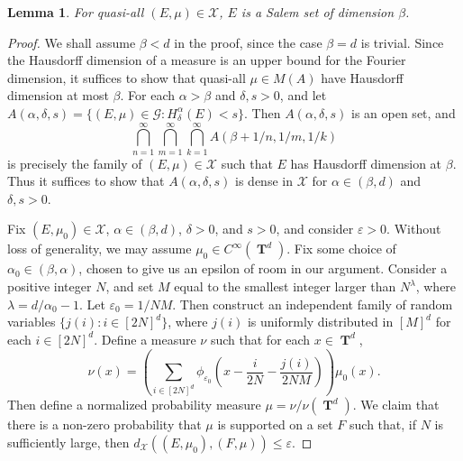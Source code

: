 \documentclass[12pt,reqno]{article}
\numberwithin{equation}{section}
\DeclareMathOperator{\hausdim}{\dim_{\mathbf{H}}}
\DeclareMathOperator{\fordim}{\dim_{\mathbf{F}}}
\DeclareMathOperator{\TT}{\mathbf{T}}
\newtheorem{lemma}[theorem]{Lemma}
\begin{document}
\begin{lemma}
    For quasi-all $(E,\mu) \in \mathcal{X}$, $E$ is a Salem set of dimension $\beta$.
\end{lemma}
\begin{proof}
    We shall assume $\beta < d$ in the proof, since the case $\beta = d$ is trivial. Since the Hausdorff dimension of a measure is an upper bound for the Fourier dimension, it suffices to show that quasi-all $\mu \in M(A)$ have Hausdorff dimension at most $\beta$. For each $\alpha > \beta$ and $\delta, s > 0$, and let $A(\alpha,\delta,s) = \{ (E,\mu) \in \mathcal{G}: H^\alpha_\delta(E) < s \}$. Then $A(\alpha,\delta,s)$ is an open set, and
    \[ \bigcap_{n = 1}^\infty \bigcap_{m = 1}^\infty \bigcap_{k = 1}^\infty A(\beta + 1/n, 1/m, 1/k) \]
    is precisely the family of $(E,\mu) \in \mathcal{X}$ such that $E$ has Hausdorff dimension at $\beta$.
%
    Thus it suffices to show that $A(\alpha,\delta,s)$ is dense in $\mathcal{X}$ for $\alpha \in (\beta,d)$ and $\delta, s > 0$.

    Fix $(E,\mu_0) \in \mathcal{X}$, $\alpha \in (\beta,d)$, $\delta > 0$, and $s > 0$, and consider $\varepsilon > 0$. Without loss of generality, we may assume $\mu_0 \in C^\infty(\TT^d)$. Fix some choice of $\alpha_0 \in (\beta,\alpha)$, chosen to give us an epsilon of room in our argument. Consider a positive integer $N$, and set $M$ equal to the smallest integer larger than $N^\lambda$, where $\lambda = d/\alpha_0 - 1$. Let $\varepsilon_0 = 1/NM$. Then construct an independent family of random variables $\{ j(i) : i \in [2N]^d \}$, where $j(i)$ is uniformly distributed in $[M]^d$ for each $i \in [2N]^d$. Define a measure $\nu$ such that for each $x \in \TT^d$,
    \[ \nu(x) = \left( \sum_{i \in [2N]^d} \phi_{\varepsilon_0} \left( x - \frac{i}{2N} - \frac{j(i)}{2NM} \right) \right) \mu_0(x). \]
    Then define a normalized probability measure $\mu = \nu / \nu(\TT^d)$. We claim that there is a non-zero probability that $\mu$ is supported on a set $F$ such that, if $N$ is sufficiently large, then $d_{\mathcal{X}}((E,\mu_0),(F,\mu)) \leq \varepsilon$.


\end{proof}
\end{document}

